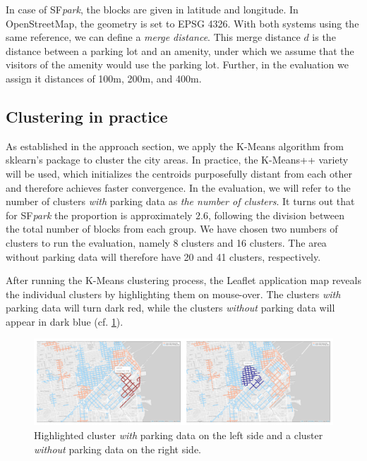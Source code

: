 \documentclass{ws-ijait}
\begin{document}
		In case of SF\textit{park}, the blocks are given in latitude and longitude.
		In OpenStreetMap, the geometry is set to EPSG 4326.
		With both systems using the same reference, we can define a \textit{merge distance}.
		This merge distance $d$ is the distance between a parking lot and an amenity, under which we assume that the visitors of the amenity would use the parking lot.
		Further, in the evaluation we assign it distances of 100m, 200m, and 400m.
		
		\subsection{Clustering in practice}
		As established in the approach section, we apply the K-Means algorithm from sklearn's package to cluster the city areas. In practice, the K-Means++ variety will be used, which initializes the centroids purposefully distant from each other and therefore achieves faster convergence.
		In the evaluation, we will refer to the number of clusters \textit{with} parking data as \textit{the number of clusters}.
		It turns out that for SF\textit{park} the proportion is approximately $2.6$, following the division between the total number of blocks from each group.
		We have chosen two numbers of clusters to run the evaluation, namely 8 clusters and 16 clusters.
		The area without parking data will therefore have 20 and 41 clusters, respectively. 
		
		After running the K-Means clustering process, the Leaflet application map reveals the individual clusters by highlighting them on mouse-over.
		The clusters \textit{with} parking data will turn dark red, while the clusters \textit{without} parking data will appear in dark blue (cf. \cref{fig:highlighted_collage}). 
		
		\begin{figure}[!ht]
			\centering
			\includegraphics[width=\textwidth]{../graphics/highlighted_collage.png}
			\caption{Highlighted cluster \textit{with} parking data on the left side and a cluster \textit{without} parking data on the right side.}
			\label{fig:highlighted_collage}
		\end{figure}
		
\end{document}
